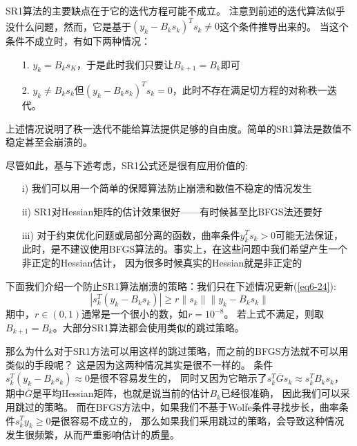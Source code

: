 \documentclass{article}
\begin{document}
SR1算法的主要缺点在于它的迭代方程可能不成立。
注意到前述的迭代算法似乎没什么问题，然而，它是基于$(y_k-B_ks_k)^Ts_k\ne 0$这个条件推导出来的。
当这个条件不成立时，有如下两种情况：
\begin{itemize}
  \item [1.] $y_k = B_ks_K$，于是此时我们只要让$B_{k+1} = B_k$即可
  \item [2.] $y_k \ne B_ks_k$但$(y_k-B_ks_k)^Ts_k=0$，此时不存在满足切方程的对称秩一迭代。
\end{itemize}
上述情况说明了秩一迭代不能给算法提供足够的自由度。简单的SR1算法是数值不稳定甚至会崩溃的。

尽管如此，基与下述考虑，SR1公式还是很有应用价值的:
\begin{itemize}
  \item [i)]我们可以用一个简单的保障算法防止崩溃和数值不稳定的情况发生
  \item [ii)]SR1对Hessian矩阵的估计效果很好——有时候甚至比BFGS法还要好
  \item [iii)]对于约束优化问题或局部分离的函数，曲率条件$y_k^Ts_k>0$可能无法保证，
  此时，是不建议使用BFGS算法的。事实上，在这些问题中我们希望产生一个非正定的Hessian估计，
  因为很多时候真实的Hessian就是非正定的
\end{itemize}

下面我们介绍一个防止SR1算法崩溃的策略：我们只在下述情况更新(\ref{eq6-24}):
\begin{equation}
  \label{eq6-26}
  |s_k^T(y_k - B_ks_k)| \ge r\|s_k\| \|y_k - B_ks_k\|
\end{equation}
期中，$r\in(0,1)$通常是一个很小的数，如$r = 10^{-8}$。
若上式不满足，则取$B_{k+1} = B_k$。大部分SR1算法都会使用类似的跳过策略。

那么为什么对于SR1方法可以用这样的跳过策略，而之前的BFGS方法就不可以用类似的手段呢？
这是因为这两种情况其实是很不一样的。
条件$s_k^T(y_k-B_ks_k)\approx 0$是很不容易发生的，
同时又因为它暗示了$s_k^T\bar{G}s_k\approx s_k^TB_ks_k$，
期中$\bar{G}$是平均Hessian矩阵，也就是说当前的估计$B_k$已经很准确，
因此我们可以采用跳过的策略。
而在BFGS方法中，如果我们不基于Wolfe条件寻找步长，曲率条件$s_k^Ty_k\ge 0$是很容易不成立的，
那么如果我们采用跳过的策略，会导致这种情况发生很频繁，从而严重影响估计的质量。
\end{document}
